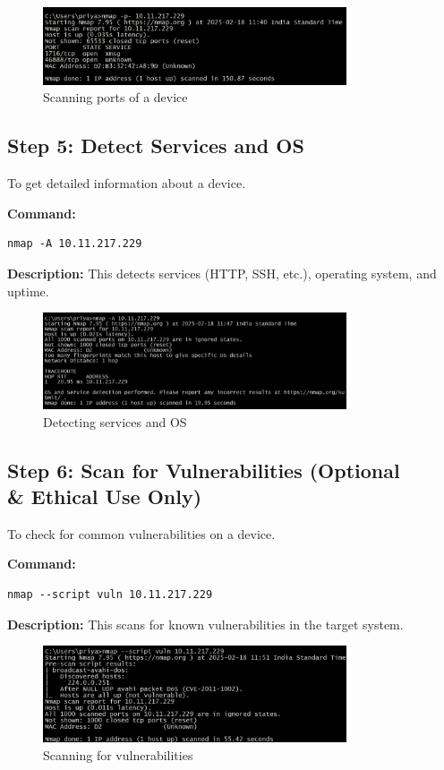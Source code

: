 \documentclass{article}
\begin{document}
\begin{figure}[h]
    \centering
    \includegraphics[width=0.8\textwidth]{images/port_scan.png}
    \caption{Scanning ports of a device}
\end{figure}

\subsection{Step 5: Detect Services and OS}
To get detailed information about a device.

\textbf{Command:}
\begin{lstlisting}
nmap -A 10.11.217.229
\end{lstlisting}
\textbf{Description:} This detects services (HTTP, SSH, etc.), operating system, and uptime.

\begin{figure}[h]
    \centering
    \includegraphics[width=0.8\textwidth]{images/service_detection.jpg}
    \caption{Detecting services and OS}
\end{figure}

\subsection{Step 6: Scan for Vulnerabilities (Optional \\& Ethical Use Only)}
To check for common vulnerabilities on a device.

\textbf{Command:}
\begin{lstlisting}
nmap --script vuln 10.11.217.229
\end{lstlisting}
\textbf{Description:} This scans for known vulnerabilities in the target system.

\begin{figure}[h]
    \centering
    \includegraphics[width=0.8\textwidth]{images/vuln_scan.jpg}
    \caption{Scanning for vulnerabilities}
\end{figure}
\end{document}

